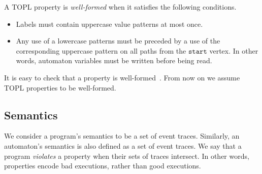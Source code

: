 \documentclass[10pt]{llncs} %
\newcommand{\start}{\ensuremath{\mathtt{start}}\xspace}
\begin{document}
A TOPL property is \emph{well-formed} when it satisfies the following conditions.
\begin{itemize}
\item Labels must contain uppercase value patterns at most once.
\item Any use of a lowercase patterns must be preceded by a use of the corresponding uppercase pattern on all paths from the \start vertex.
  In other words, automaton variables must be written before being read.
\end{itemize}
It is easy to check that a property is well-formed~\cite{web:topl.prototype}.
From now on we assume TOPL properties to be well-formed.


\subsection{Semantics}\label{sec:semantics} %

We consider a program's semantics to be a set of event traces.
Similarly, an automaton's semantics is also defined as a set of event traces.
We say that a program \emph{violates} a property when their sets of traces intersect.
In other words, properties encode bad executions, rather than good executions.
\end{document}
